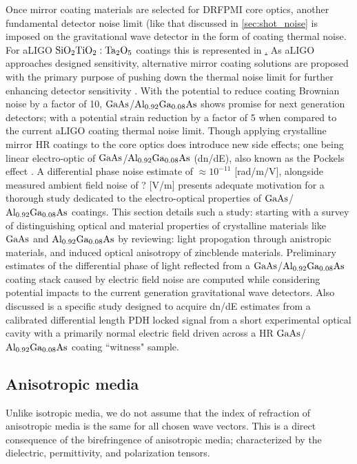 
Once mirror coating materials are selected for DRFPMI core optics, another fundamental detector noise limit (like that discussed in \ref{sec:shot_noise} is imposed on the gravitational wave detector in the form of coating thermal noise. For aLIGO $\mathrm{SiO_2}\mathrm{TiO_2:Ta_2O_5}$ coatings this is represented in \hyperref[sec:ligo_noise]. As aLIGO approaches designed sensitivity, alternative mirror coating solutions are proposed with the primary purpose of pushing down the thermal noise limit for further enhancing detector sensitivity \cite{AIGWD:Harry}. With the potential to reduce coating Brownian noise by a factor of 10, $\mathrm{GaAs}$/$\mathrm{Al_{0.92}Ga_{0.08}As}$ shows promise for next generation detectors; with a potential strain reduction by a factor of 5 \cite{Cole:2013} when compared to the current aLIGO coating thermal noise limit. Though applying crystalline mirror HR coatings to the core optics does introduce new side effects; one being linear electro-optic of $\mathrm{GaAs}$/$\mathrm{Al_{0.92}Ga_{0.08}As}$ (dn/dE), also known as the Pockels effect \cite{abernathyposter}. A differential phase noise estimate of $\approx 10^{-11}$ [rad/m/V], alongside measured ambient field noise of ? [V/m] presents adequate motivation for a thorough study dedicated to the electro-optical properties of $\mathrm{GaAs}$/$\mathrm{Al_{0.92}Ga_{0.08}As}$ coatings. This section details such a study: starting with a survey of distinguishing optical and material properties of crystalline materials like $\mathrm{GaAs}$ and $\mathrm{Al_{0.92}Ga_{0.08}As}$ by reviewing: light propogation through anistropic materials, and induced optical anisotropy of zincblende materials. Preliminary estimates of the differential phase of light reflected from a $\mathrm{GaAs}$/$\mathrm{Al_{0.92}Ga_{0.08}As}$ coating stack caused by electric field noise are computed while considering potential impacts to the current generation gravitational wave detectors. Also discussed is a specific study designed to acquire dn/dE estimates from a calibrated differential length PDH locked signal from a short experimental optical cavity with a primarily normal electric field driven across a HR $\mathrm{GaAs}$/$\mathrm{Al_{0.92}Ga_{0.08}As}$ coating ``witness" sample.

\subsection{Anisotropic media}
Unlike isotropic media, we do not assume that the index of refraction of anisotropic media is the same for all chosen wave vectors. This is a direct consequence of the birefringence of anisotropic media; characterized by the dielectric, permittivity, and polarization tensors.

